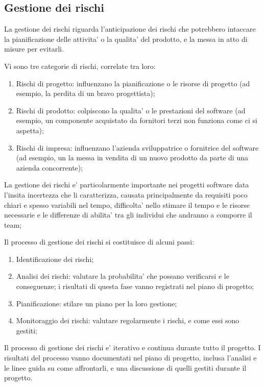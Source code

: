 \subsection{Gestione dei rischi}
La gestione dei rischi riguarda l'anticipazione dei rischi che potrebbero intaccare la pianificazione delle attivita' o la qualita' del prodotto, e la messa in atto di misure per evitarli.

Vi sono tre categorie di rischi, correlate tra loro:
\begin{enumerate}
	\item Rischi di progetto: influenzano la pianificazione o le risorse di progetto (ad esempio, la perdita di un bravo progettista);
	\item Rischi di prodotto: colpiscono la qualita' o le prestazioni del software (ad esempio, un componente acquistato da fornitori terzi non funziona come ci si aspetta);
	\item Rischi di impresa: influenzano l'azienda sviluppatrice o fornitrice del software (ad esempio, un la messa in vendita di un nuovo prodotto da parte di una azienda concorrente);
\end{enumerate}

La gestione dei rischi e' particolarmente importante nei progetti software data l'insita incertezza che li caratterizza, causata principalmente da requisiti poco chiari e spesso variabili nel tempo, difficolta' nello stimare il tempo e le risorse necessarie e le differenze di abilita' tra gli individui che andranno a comporre il team;

Il processo di gestione dei rischi si costituisce di alcuni passi:
\begin{enumerate}
	\item Identificazione dei rischi;
	\item Analisi dei rischi: valutare la probabilita' che possano verificarsi e le conseguenze; i risultati di questa fase vanno registrati nel piano di progetto;
	\item Pianificazione: stilare un piano per la loro gestione; 
	\item Monitoraggio dei rischi: valutare regolarmente i rischi, e come essi sono gestiti;
\end{enumerate}

Il processo di gestione dei rischi e' iterativo e continua durante tutto il progetto. I risultati del processo vanno documentati nel piano di progetto, inclusa l'analisi e le linee guida su come affrontarli, e una discussione di quelli gestiti durante il progetto.

